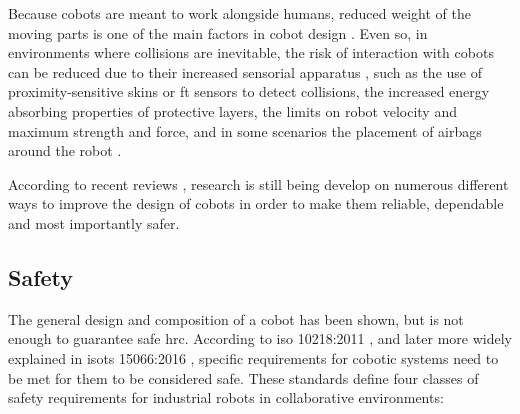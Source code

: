 \par Because cobots are meant to work alongside humans, reduced weight of the moving parts is one of the main factors in cobot design \cite{cobot.light}. Even so, in environments where collisions are inevitable, the risk of interaction with cobots can be reduced due to their increased sensorial apparatus \cite{cobot.sensor}, such as the use of proximity-sensitive skins or \ac{ft} sensors to detect collisions, the increased energy absorbing properties of protective layers, the limits on robot velocity and maximum strength and force, and in some scenarios the placement of airbags around the robot \cite{cobot.airbag}.

\par According to recent reviews \cite{paper.review.1, paper.review.2}, research is still being develop on numerous different ways to improve the design of cobots in order to make them reliable, dependable and most importantly safer.


\subsection{Safety}


\par The general design and composition of a cobot has been shown, but is not enough to guarantee safe \ac{hrc}. According to \acs{iso} 10218:2011 \cite{iso.10218.1, iso.10218.2}, and later more widely explained in \acs{isots} 15066:2016 \cite{iso.15066}, specific requirements for cobotic systems need to be met for them to be considered safe. These standards define four classes of safety requirements for industrial robots in collaborative environments:

